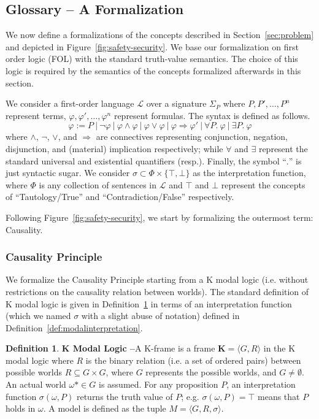 \documentclass{article}
\theoremstyle{definition}
\newtheorem{definition}{Definition}[section]
\theoremstyle{corollary}
\theoremstyle{lemma}
\theoremstyle{theorem}
\theoremstyle{theorem}
\newcommand{\kframe}{\mathbf{K}}
\newcommand{\possibleworlds}{G}
\newcommand{\modalrelation}{R}
\newcommand{\actualworld}{\omega*}
\newcommand{\world}{\omega}
\newcommand{\kmodel}{M}
\newcommand{\interpretation}{\sigma}
\newcommand{\follang}{\mathcal{L}}
\begin{document}
\subsection{Glossary -- A Formalization}\label{sec:glossary}
We now define a formalizations of the concepts described in
Section~\ref{sec:problem} and depicted in Figure~\ref{fig:safety-security}. We
base our formalization on first order logic (FOL) with the standard
truth-value semantics. The choice of this logic is required by the 
semantics of the concepts formalized afterwards in this section. 

We consider a first-order language $\follang$ over a
signature $\Sigma_P$ where $P,P',\ldots,P^n$ represent terms, 
$\varphi,\varphi',\ldots,\varphi^n$ represent formulas.
The syntax is defined as follows.
\begin{displaymath}
	\varphi := P~|~\neg\varphi~|~\varphi\wedge\varphi~|~\varphi\vee\varphi~|~\varphi\Rightarrow\varphi'~|~\forall P.~\varphi~|~\exists P.~\varphi
\end{displaymath}
where $\wedge$, $\neg$, $\vee$, and $\Rightarrow$ are connectives representing
conjunction, negation, disjunction, and (material) implication respectively; while
$\forall$ and $\exists$ represent the standard universal and existential
quantifiers (resp.). Finally, the symbol ``$.$'' is just syntactic sugar. 
We consider $\interpretation\subset\Phi\times\{\top,\bot\}$ as the interpretation
function, where $\Phi$ is any collection of sentences in $\follang$ 
and $\top$ and $\bot$ represent the concepts of ``Tautology/True''
and ``Contradiction/False'' respectively.

Following Figure~\ref{fig:safety-security}, we start by formalizing the outermost term: Causality.

\subsubsection{Causality Principle}\label{sec:causality}
We formalize the Causality Principle starting from a K modal
logic\autocite{Garson2018modal} (i.e. without restrictions on the causality
relation between worlds). The standard definition of K modal logic is given in
Definition~\ref{def:modallogic} in terms of an interpretation function (which
we named $\sigma$ with a slight abuse of notation) defined in
Definition~\ref{def:modalinterpretation}. 
\begin{definition}{\bf K Modal Logic --}\label{def:modallogic}
A K-frame is a frame $ \kframe=\langle \possibleworlds,\modalrelation \rangle $
	in the K modal logic where $ \modalrelation $ is the binary relation
	(i.e. a set of ordered pairs) between possible worlds
	$\modalrelation\subseteq\possibleworlds\times\possibleworlds$, where
	$\possibleworlds$ represents the possible worlds, and
	$\possibleworlds\neq\emptyset$. An actual world
	$\actualworld\in\possibleworlds$ is assumed. For any proposition $P$,
	an interpretation function $\interpretation(\world,P)$ returns the
	truth value of $P$; e.g. $\interpretation(\world,P)=\top$ means that
	$P$ holds in $\world$. A model is defined as the tuple
	$\kmodel=\langle\possibleworlds,\modalrelation,\interpretation\rangle$.
\end{definition}
\end{document}
